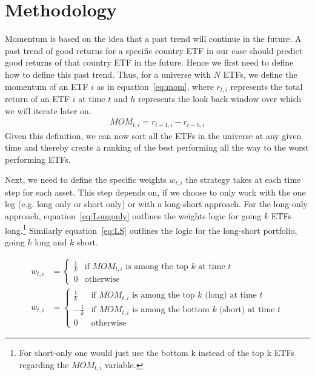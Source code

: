 \documentclass[a4paper,12pt,twoside]{article}
\begin{document}
\section{Methodology}\label{sec:methodology}
Momentum is based on the idea that a past trend will continue in the future. A past trend of good returns for a specific country ETF in our case should predict good returns of that country ETF in the future. Hence we first need to define how to define this past trend.
Thus, for a universe with $N$ ETFs, we define the momentum of an ETF $i$ as in equation~\ref{eq:mom}, where $r_{t,i}$ represents the total return of an ETF $i$ at time $t$ and $h$ represents the look back window over which we will iterate later on.
\begin{align}
MOM_{t,i} = r_{t-1,i}-r_{t-h,i}
 \label{eq:mom}
\end{align}
Given this definition, we can now sort all the ETFs in the universe at any given time and thereby create a ranking of the best performing all the way to the worst performing ETFs.\par
Next, we need to define the specific weights $w_{t,i}$ the strategy takes at each time step for each asset. This step depends on, if we choose to only work with the one leg (e.g. long only or short only) or with a long-short approach. For the long-only approach, equation~\ref{eq:Longonly} outlines the weights logic for going $k$ ETFs long.\footnote{For short-only one would just use the bottom k instead of the top k ETFs regarding the $MOM_{t,i}$ variable.}
Similarly equation~\ref{eq:LS} outlines the logic for the long-short portfolio, going $k$ long and $k$ short.\par
\begin{align}
w_{t,i} &=
\begin{cases}
\frac{1}{k}   & \text{if } MOM_{t,i} \text{ is among the top } k \text{ at time } t \\
0             & \text{otherwise}
\end{cases}
\label{eq:Longonly} \\[10pt]
w_{t,i} &=
\begin{cases}
\frac{1}{k}  & \text{if } MOM_{t,i} \text{ is among the top } k \text{ (long) at time } t \\
-\frac{1}{k} & \text{if } MOM_{t,i} \text{ is among the bottom } k \text{ (short) at time } t \\
0             & \text{otherwise}
\end{cases}
\label{eq:LS}
\end{align}
\end{document}
